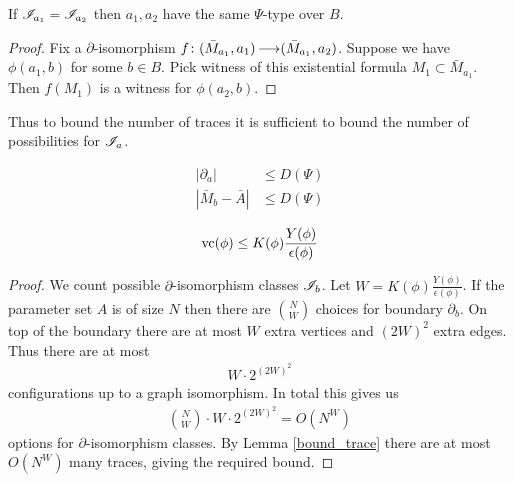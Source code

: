 \begin{Lemma} \label {bound_trace}
  If $\mathscr I_{a_1} = \mathscr I_{a_2}$ then $a_1, a_2$ have the same $\Psi$-type over $B$.
\end{Lemma}

\begin{proof}
  Fix a $\partial$-isomorphism $f \colon (\bar M_{a_1}, a_1) \operatorname{\longrightarrow} (\bar M_{a_1}, a_2)$.
  Suppose we have $\phi(a_1, b)$ for some $b \in B$.
  Pick witness of this existential formula $M_1 \subset \bar M_{a_1}$.
  Then $f(M_1)$ is a witness for  $\phi(a_2, b)$.
\end{proof}

Thus to bound the number of traces it is sufficient to bound the number of possibilities for $\mathscr I_a$.

\begin{Theorem} \label{main_bound}
  \begin{align*}
    |\partial_a| &\leq D(\Psi) \\ 
    |\bar M_b - \bar A| &\leq D(\Psi)
  \end{align*}
\end{Theorem}

\begin{Corollary}
  \begin{align*}
    \operatorname{vc}(\phi) \leq K(\phi) \frac{Y(\phi)}{\epsilon(\phi)}
  \end{align*}
\end{Corollary}

\begin{proof}
  We count possible $\partial$-isomorphism classes $\mathscr I_b$.
  Let $W = K(\phi) \frac{Y(\phi)}{\epsilon(\phi)}$.
  If the parameter set $A$ is of size $N$ then there are $N \choose W$ choices for boundary $\partial_b$.
  On top of the boundary there are at most $W$ extra vertices and $(2W)^2$ extra edges.
  Thus there are at most
  \begin{align*}
    W \cdot 2^{(2W)^2}
  \end{align*}
  configurations up to a graph isomorphism.
  In total this gives us 
  \begin{align*}
    {N \choose W} \cdot W \cdot 2^{(2W)^2} = O(N^W)
  \end{align*}
  options for $\partial$-isomorphism classes.
  By Lemma \ref{bound_trace} there are at most $O(N^W)$ many traces, giving the required bound.
\end{proof}

